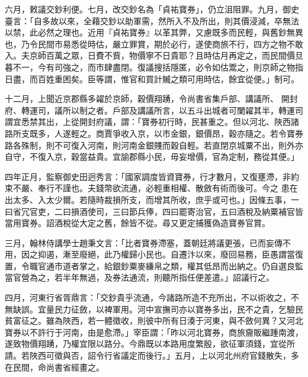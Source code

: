 \begin{pinyinscope}
 六月，敕議交鈔利便。七月，改交鈔名為「貞祐寶券」，仍立沮阻罪。九月，御史
 臺言：「自多故以來，全藉交鈔以助軍需，然所入不及所出，則其價浸減，卒無法以禁，此必然之理也。近用『貞祐寶券』以革其弊，又慮既多而民輕，與舊鈔無異也，乃令民間市易悉從時估，嚴立罪賞，期於必行，遂使商旅不行，四方之物不敢入。夫京師百萬之眾，日費不貲，物價寧不日貴耶？且時估月再定之，而民間價旦暮不一，今有司強之，而市肆盡閉。復議搜括隱匿，必令如估鬻之，則京師之物指日盡，而百姓重困矣。臣等謂，惟官和買計贓之類可用時估，餘宜從便。」制可。



 十二月，上聞近京郡縣多糴於京師，穀價翔踴，令尚書省集戶部、講議所、
 開封府、轉運司，議所以制之者。戶部及講議所言，以五斗出城者可闌糴其半，轉運司謂宜悉禁其出，上從開封府議，謂：「寶券初行時，民甚重之。但以河北、陜西諸路所支既多，人遂輕之。商賈爭收入京，以市金銀，銀價昂，穀亦隨之。若令寶券路各殊制，則不可復入河南，則河南金銀賤而穀自輕。若直閉京城粟不出，則外亦自守，不復入京，穀當益貴。宜諭郡縣小民，毋妄增價，官為定制，務從其便。」



 四年正月，監察御史田迥秀言：「國家調度皆資寶券，行才數月，又復壅滯，非約束不嚴、奉行不謹也。夫錢幣欲流通，必輕重相權、散斂有術而後可。今之
 患在出太多、入太少爾。若隨時裁損所支，而增其所收，庶乎或可也。」因條五事，一曰省冗官吏，二曰損酒使司，三曰節兵俸，四曰罷寄治官，五曰酒稅及納粟補官皆當用寶券。詔酒稅從大定之舊，餘皆不從。尋又更定捕獲偽造寶券官賞。



 三月，翰林侍講學士趙秉文言：「比者寶券滯塞，蓋朝廷將議更張，已而妄傳不用，因之抑遏，漸至廢絕，此乃權歸小民也。自遷汴以來，廢回易務，臣愚謂當復置，令職官通市道者掌之，給銀鈔粟麥縑帛之類，權其低昂而出納之。仍自選良監當官營為之，若半年無過，及券法通流，則聽所指任便差遣。」詔議行之。



 四月，河東行省胥鼎言：「交鈔貴乎流通，今諸路所造不充所出，不以術收之，不無缺誤。宜量民力征斂，以裨軍用。河中宣撫司亦以寶券多出，民不之貴，乞驗民貧富征之。雖為陜西，若一體徵收，則彼中所有日湊于河東，與不斂何異？又河北寶券以不許行于河南，由是愈滯。」宰臣謂：「昨以河北寶券，商旅齎販繼踵南渡，遂致物價翔踴，乃權宜限以路分。今鼎既以本路用度繁殷，欲征軍須錢，宜從所請。若陜西可徵與否，詔令行省議定而後行。」五月，上以河北州府官錢散失，多在民間，命尚書省經畫之。




\end{pinyinscope}
